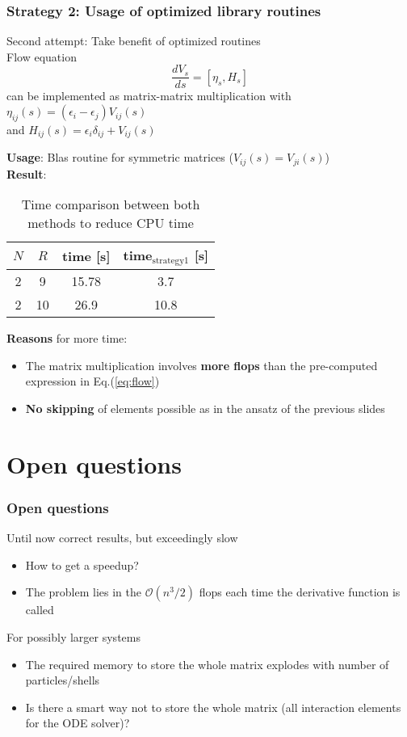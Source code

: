 \documentclass[9pt]{beamer}
\begin{document}
\begin{frame}
\frametitle{Strategy 2: Usage of optimized library routines}
Second attempt: Take benefit of optimized {\color{red}{matrix-matrix multiplication}} routines\\
Flow equation
\[
\frac{dV_s}{ds}  = \left[\eta_s, H_s\right]
\]
can be implemented as matrix-matrix multiplication with  $\eta_{ij}(s) = \left( \epsilon_i - \epsilon_j \right) V_{ij}(s)$ \\
and $H_{ij}(s) = \epsilon_i \delta_{ij} + V_{ij}(s)$

\textbf{Usage}: Blas routine for symmetric matrices ($V_{ij}(s) = V_{ji}(s)$)\\

\textbf{Result}: 
\begin{table}
\begin{center}
\begin{tabular}{c c c c}
\hline\hline
$N$ & $R$ & time [s] & time$_{\text{strategy1}}$ [s] \\
\hline 
2 & 9 & 15.78& 3.7 \\
2 & 10 & 26.9 & 10.8\\
 \hline\hline
\end{tabular}
\end{center}
\caption{Time comparison between both methods to reduce CPU time}
\end{table}
\textbf{Reasons} for more time:
\begin{itemize}
\item The matrix multiplication involves \textbf{more flops} than the pre-computed expression in Eq.(\ref{eq:flow})
\item \textbf{No skipping} of elements possible as in the ansatz of the previous slides
\end{itemize}

\end{frame}


\section{Open questions}
\begin{frame}
\frametitle{Open questions}
Until now correct results, but exceedingly slow
\begin{itemize}
\item How to get a speedup? 
\item The problem lies in the $\mathcal{O}(n^3/2)$ flops each time the derivative function is called
\end{itemize}
For possibly larger systems
\begin{itemize}
\item The required memory to store the whole matrix explodes with number of particles/shells
\item Is there a smart way not to store the whole matrix (all interaction elements for the ODE solver)?
\end{itemize}


\end{frame}
\end{document}

